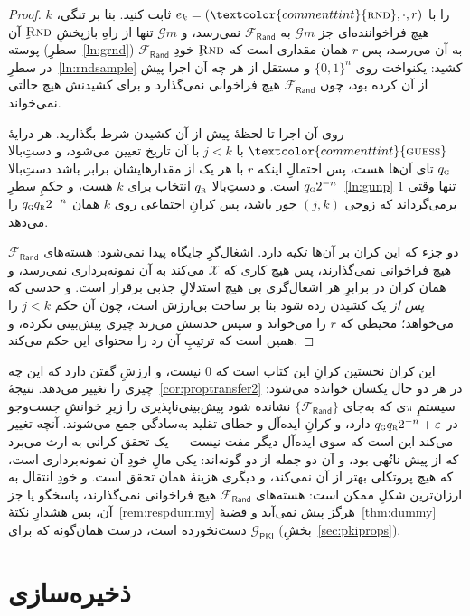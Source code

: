 \documentclass[10pt,oneside,openany]{book}
\newcommand{\op}[1]{\textnormal{\textsc{#1}}}
\newcommand{\atom}[1]{\textcolor{commenttint}{\op{#1}}}
\newcommand{\Gm}{\mathcal{G}m}
\newcommand{\Frand}{\mathcal{F}_{\mathsf{Rand}}}
\newcommand{\Gpki}{\mathcal{G}_{\mathsf{PKI}}}
\theoremstyle{accentdef}
\theoremstyle{accentplain}
\begin{document}
\begin{proof}
$k$ را با $e_k = (\atom{rnd},\cdot,r)$ ثابت کنید. بنا بر تنگی، هیچ
فراخواننده‌ای جز $\Gm$ به $\Frand$ نمی‌رسد، و $\Gm$ تنها از راهِ بازپخشِ
$\op{Rnd}$ِ آن پوسته (سطرِ~\ref{ln:grnd}) به آن می‌رسد، پس $r$ همان مقداری
است که $\op{Rnd}$ِ خودِ $\Frand$ در سطرِ~\ref{ln:rndsample} کشید: یکنواخت
روی $\{0,1\}^{n}$ و مستقل از هر چه آن اجرا پیش از آن کرده بود، چون $\Frand$
هیچ فراخوانی نمی‌گذارد و برای کشیدنش هیچ حالتی نمی‌خواند.

روی آن اجرا تا لحظهٔ پیش از آن کشیدن شرط بگذارید. هر درایهٔ $\atom{guess}$ با
$j < k$ با آن تاریخ تعیین می‌شود، و دستِ‌بالا $q_{\op{g}}$ تای آن‌ها هست،
پس احتمالِ اینکه $r$ با هر یک از مقدارهایشان برابر باشد دستِ‌بالا
$q_{\op{g}} 2^{-n}$ است. و دستِ‌بالا $q_{\op{r}}$ انتخاب برای $k$ هست، و
حکمِ سطرِ~\ref{ln:gunp} تنها وقتی $1$ برمی‌گرداند که زوجی $(j,k)$ جور
باشد، پس کرانِ اجتماعی روی $k$ همان $q_{\op{g}} q_{\op{r}} 2^{-n}$ را
می‌دهد.

دو جزء که این کران بر آن‌ها تکیه دارد. اشغال‌گرِ جایگاه پیدا نمی‌شود:
هسته‌های $\Frand$ هیچ فراخوانی نمی‌گذارند، پس هیچ کاری که $\mathcal{X}$
می‌کند به آن نمونه‌برداری نمی‌رسد، و همان کران در برابرِ هر اشغال‌گری بی هیچ
استدلالِ جذبی برقرار است. و حدسی که \emph{پس از} یک کشیدن زده شود بنا بر ساخت
بی‌ارزش است، چون آن حکم $j < k$ را می‌خواهد؛ محیطی که $r$ را می‌خواند و
سپس حدسش می‌زند چیزی پیش‌بینی نکرده، و همین است که ترتیبِ آن رد را محتوای این
حکم می‌کند.
\end{proof}

این کران نخستین کرانِ این کتاب است که $0$ نیست، و ارزشِ گفتن دارد که این چه
چیزی را تغییر می‌دهد. نتیجهٔ~\ref{cor:proptransfer2} در هر دو حال یکسان
خوانده می‌شود: سیستمِ $\pi$ی که به‌جای $\{\Frand\}$ نشانده شود
پیش‌بینی‌ناپذیری را زیرِ خوانشِ جست‌وجو در $q_{\op{g}} q_{\op{r}} 2^{-n} +
\varepsilon$ دارد، و کرانِ ایده‌آل و خطای تقلید به‌سادگی جمع می‌شوند. آنچه
تغییر می‌کند این است که سوی ایده‌آل دیگر مفت نیست --- یک تحقق کرانی به ارث
می‌برد که از پیش ناتُهی بود، و آن دو جمله از دو گونه‌اند: یکی مالِ خودِ آن
نمونه‌برداری است، که هیچ پروتکلی بهتر از آن نمی‌کند، و دیگری هزینهٔ همان
تحقق است. و خودِ انتقال به ارزان‌ترین شکلِ ممکن است: هسته‌های $\Frand$ هیچ
فراخوانی نمی‌گذارند، پاسخگو یا جز آن، پس هشدارِ نکتهٔ~\ref{rem:respdummy}
هرگز پیش نمی‌آید و قضیهٔ~\ref{thm:dummy} دست‌نخورده است، درست همان‌گونه که
برای $\Gpki$ (بخشِ~\ref{sec:pkiprops}).

\chapter{ذخیره‌سازی}\label{sec:fstore}
\end{document}
